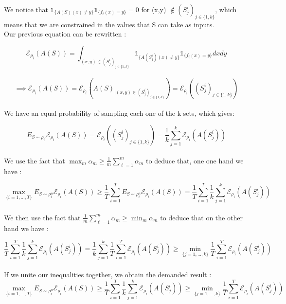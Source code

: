 \documentclass[final,3p,times,12pt]{article}
\begin{document}
\begin{enumerate}
\begin{enumerate}
We notice that $\mathbb{1}_{ \{ A(S)(x)\neq y \} } \mathbb{1}_{\{f_i(x) = y\}} = 0$ for (x,y) $\notin (S_j^i)_{j\in \{1, k\}}$, which means that we are constrained in the values that S can take as inputs.\\

Our previous equation can be rewritten :

\[
\mathcal{E}_{\rho_i}(A(S)) = \int_{(x,y)\in (S_j^i)_{j\in \{1, k\}} } \mathbb{1}_{\{A(S_j^i)(x)\neq y\}} \mathbb{1}_{\{f_i(x) = y\}} dxdy
\]\\
\[ \implies
\mathcal{E}_{\rho_i}(A(S)) = \mathcal{E}_{\rho_i}(A(S)_{| (x,y)\in (S_j^i)_{j\in \{1, k\}}}) = \mathcal{E}_{\rho_i}((S_j^i)_{j\in \{1, k\}})
\]\\

We have an equal probability of sampling each one of the k sets, which gives: 

\[
E_{S \sim \rho_i^n} \mathcal{E}_{\rho_i}(A(S)) = \mathcal{E}_{\rho_i}((S_j^i)_{j\in \{1, k\}}) = \frac{1}{k} \sum_{j=1}^k \mathcal{E}_{\rho_i}(A(S_j^i))
\]\\

We use the fact that $\max_m \alpha_m \geq \frac{1}{m} \sum_{\ell=1}^{m} \alpha_m$ to deduce that, one one hand we have :

\[
\max_{\{i=1, ..., T\}}E_{S \sim \rho_i^n} \mathcal{E}_{\rho_i}(A(S))\geq \frac{1}{T} \sum_{i=1}^T E_{S \sim \rho_i^n} \mathcal{E}_{\rho_i}(A(S)) = \frac{1}{T} \sum_{i=1}^T\frac{1}{k} \sum_{j=1}^k \mathcal{E}_{\rho_i}(A(S_j^i))
\]\\

We then use the fact that $\frac{1}{m} \sum_{\ell=1}^{m} \alpha_m \geq \min_m \alpha_m$ to deduce that on the other hand we have :

\[
\frac{1}{T} \sum_{i=1}^T\frac{1}{k} \sum_{j=1}^k \mathcal{E}_{\rho_i}(A(S_j^i)) = \frac{1}{k} \sum_{j=1}^k\frac{1}{T} \sum_{i=1}^T \mathcal{E}_{\rho_i}(A(S_j^i)) \geq \min_{\{j=1, ..., k\}} \frac{1}{T} \sum_{i=1}^T \mathcal{E}_{\rho_i}(A(S_j^i)) 
\]\\

If we unite our inequalities together, we obtain the demanded result : \\

\[
\max_{\{i=1, ..., T\}}E_{S \sim \rho_i^n} \mathcal{E}_{\rho_i}(A(S))\geq\frac{1}{T} \sum_{i=1}^T\frac{1}{k} \sum_{j=1}^k \mathcal{E}_{\rho_i}(A(S_j^i)) \geq \min_{\{j=1, ..., k\}} \frac{1}{T} \sum_{i=1}^T \mathcal{E}_{\rho_i}(A(S_j^i)) 
\]\\


\end{enumerate}
\end{enumerate}
\end{document}
